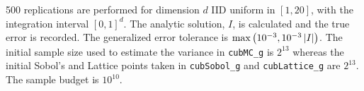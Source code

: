 \documentclass{iitthesis}
\theoremstyle{definition}
\begin{document}
%
500 replications are performed for dimension $d$ IID uniform in $[1,20]$, with the integration interval $[0,1]^d$. The analytic solution, $I$, is calculated and the true error is recorded. The generalized error tolerance is $\max\left(10^{-3},10^{-3}\left \lvert I \right \rvert\right)$. The initial sample size used to estimate the variance in {\tt cubMC\_g} is $2^{13}$ whereas the initial Sobol's and Lattice points taken in {\tt cubSobol\_g} and {\tt cubLattice\_g} are $2^{13}$. The sample budget is $10^{10}$. 
\end{document}
